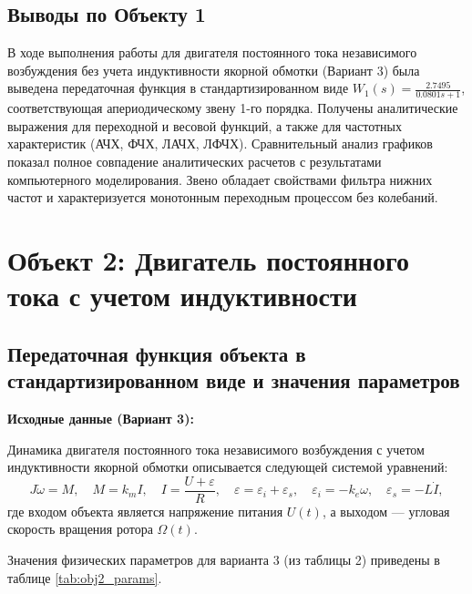 \documentclass[12pt, a4paper]{article}
\begin{document}
\subsection{Выводы по Объекту 1}

В ходе выполнения работы для двигателя постоянного тока независимого возбуждения без учета индуктивности якорной обмотки (Вариант 3) была выведена передаточная функция в стандартизированном виде $W_1(s) = \frac{2.7495}{0.0801s + 1}$, соответствующая апериодическому звену 1-го порядка. Получены аналитические выражения для переходной и весовой функций, а также для частотных характеристик (АЧХ, ФЧХ, ЛАЧХ, ЛФЧХ). Сравнительный анализ графиков показал полное совпадение аналитических расчетов с результатами компьютерного моделирования. Звено обладает свойствами фильтра нижних частот и характеризуется монотонным переходным процессом без колебаний.


\newpage
\section{Объект 2: Двигатель постоянного тока с учетом индуктивности}

\subsection{Передаточная функция объекта в стандартизированном виде и значения параметров}

\textbf{Исходные данные (Вариант 3):}

Динамика двигателя постоянного тока независимого возбуждения с учетом индуктивности якорной обмотки описывается следующей системой уравнений:
\begin{equation}
    J\dot{\omega} = M, \quad M = k_m I, \quad I = \frac{U + \varepsilon}{R}, \quad \varepsilon = \varepsilon_i + \varepsilon_s, \quad \varepsilon_i = -k_e\omega, \quad \varepsilon_s = -L\dot{I},
\end{equation}
где входом объекта является напряжение питания $U(t)$, а выходом — угловая скорость вращения ротора $\Omega(t)$.

Значения физических параметров для варианта 3 (из таблицы 2) приведены в таблице \ref{tab:obj2_params}.
\end{document}
